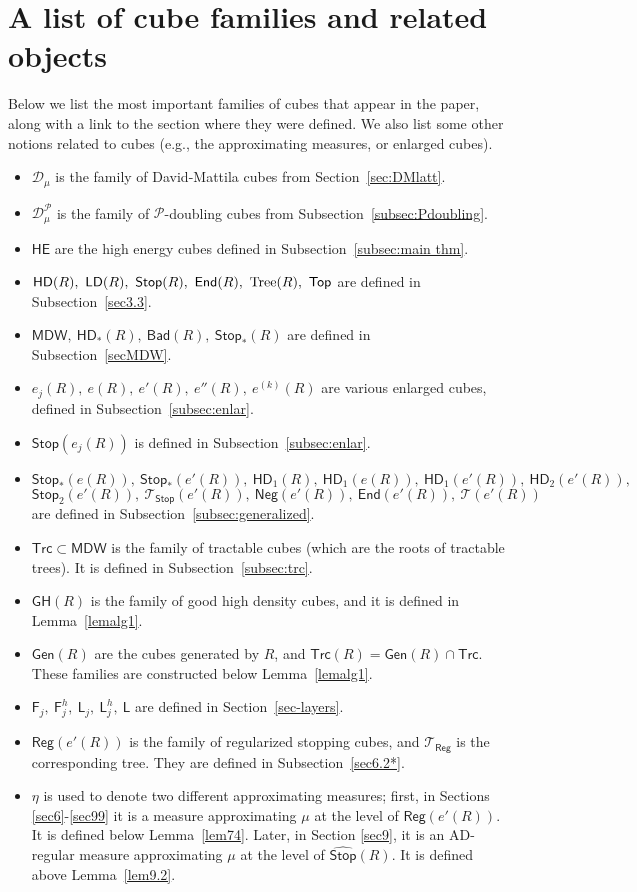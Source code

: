 \documentclass[11pt]{amsart}
\newcommand{\DD}{{\mathcal D}}
\newcommand{\PP}{{\mathcal P}}
\newcommand{\TT}{{\mathcal T}}
\newcommand{\wh}[1]{{\widehat{#1}}}
\newcommand{\sss}{{\mathsf {Stop}}}
\newcommand{\ttt}{{\mathsf {Top}}}
\newcommand{\Gen}{{\mathsf {Gen}}}
\newcommand{\tree}{{\rm Tree}}
\newcommand{\HE}{{\mathsf {HE}}}
\newcommand{\bad}{{\mathsf{Bad}}}
\newcommand{\HD}{{\mathsf{HD}}}
\newcommand{\GH}{{\mathsf{GH}}}
\newcommand{\LD}{{\mathsf{LD}}}
\newcommand{\MDW}{{\mathsf{MDW}}}
\newcommand{\Stop}{{\mathsf{Stop}}}
\newcommand{\Trc}{{\mathsf{Trc}}}
\newcommand{\sL}{{\mathsf{L}}}
\newcommand{\sF}{{\mathsf{F}}}
\newcommand{\Neg}{{\mathsf{Neg}}}
\newcommand{\End}{{\mathsf{End}}}
\newcommand{\Reg}{{\mathsf{Reg}}}
\theoremstyle{definition}
\theoremstyle{remark}
\numberwithin{equation}{section}
\begin{document}
\section{A list of cube families and related objects}\label{app:fam}
Below we list the most important families of cubes that appear in the paper, along with a link to the section where they were defined. We also list some other notions related to cubes (e.g., the approximating measures, or enlarged cubes).
\begin{itemize}
	\item $\DD_\mu$ is the family of David-Mattila cubes from Section~\ref{sec:DMlatt}.
	\item $\DD^\PP_\mu$ is the family of $\PP$-doubling cubes from Subsection~\ref{subsec:Pdoubling}.
	\item $\HE$ are the high energy cubes defined in Subsection~\ref{subsec:main thm}.
	\item $\HD(R),\ \LD(R),\ \Stop(R),\ \End(R),\ \tree(R),\ \ttt$ are defined in Subsection~\ref{sec3.3}.
	\item $\MDW,\ \HD_*(R),\ \bad(R),\ \sss_*(R)$ are defined in Subsection~\ref{secMDW}.
	\item $e_j(R),\ e(R),\ e'(R),\ e''(R),\ e^{(k)}(R)$ are various enlarged cubes, defined in Subsection~\ref{subsec:enlar}.
	\item $\sss(e_j(R))$ is defined in Subsection~\ref{subsec:enlar}.
	\item $\sss_*(e(R)),\ \sss_*(e'(R)),\ \HD_1(R),\ \HD_1(e(R)),\ \HD_1(e'(R)),\ \HD_2(e'(R)),$\\ $\sss_2(e'(R)),\ \TT_\sss(e'(R)),\ \Neg(e'(R)),\ \End(e'(R)),\ \TT(e'(R))$ are defined in Subsection~\ref{subsec:generalized}.
	\item $\Trc\subset\MDW$ is the family of tractable cubes (which are the roots of tractable trees). It is defined in Subsection~\ref{subsec:trc}.
	\item $\GH(R)$ is the family of good high density cubes, and it is defined in Lemma~\ref{lemalg1}.
	\item $\Gen(R)$ are the cubes generated by $R$, and $\Trc(R)= \Gen(R)\cap\Trc$. These families are constructed below Lemma~\ref{lemalg1}.
	\item $\sF_j,\ \sF_j^h,\ \sL_j,\ \sL_j^h,\ \sL$ are defined in Section~\ref{sec-layers}.
	\item $\Reg(e'(R))$ is the family of regularized stopping cubes, and $\TT_{\Reg}$ is the corresponding tree. They are defined in Subsection~\ref{sec6.2*}.
	\item $\eta$ is used to denote two different approximating measures; first, in Sections \ref{sec6}-\ref{sec99} it is a measure approximating $\mu$ at the level of $\Reg(e'(R))$. It is defined below Lemma~\ref{lem74}. Later, in Section \ref{sec9}, it is an AD-regular measure approximating $\mu$ at the level of $\wh\sss(R)$. It is defined above Lemma~\ref{lem9.2}.

\end{itemize}
\end{document}
